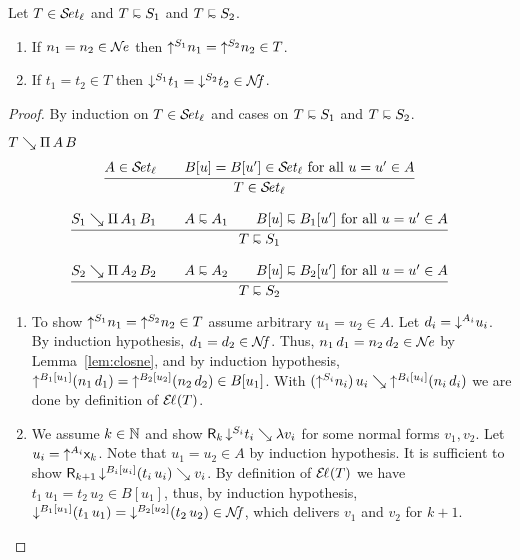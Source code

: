 \documentclass[acmlarge,review,anonymous]{acmart}\settopmatter{printfolios=true}
\begin{document}
\begin{theorem}
\label{thm:rere}
Let $T \in \SET[\ell]$ and $T \shape S_1$ and $T \shape S_2$.
\begin{enumerate}
\item If $n_1 = n_2 \in \NE$ then $\up{S_1}{n_1} = \up{S_2}{n_2} \in T$.
\item If $t_1 = t_2 \in T$ then $\down{S_1}{t_1} = \down{S_2}{t_2} \in \NF$.
\end{enumerate}
\end{theorem}
\begin{proof}
By induction on $T \in \SET[\ell]$ and cases on $T \shape S_1$ and $T \shape S_2$.
\begin{caselist}

\nextcase $T \evalsto \piT A B$
\begin{gather*}
  \ru{A \in \SET[\ell] \qquad
      B[u] = B[u'] \in \SET[\ell] \mforall u = u' \in A
    }{T \in \SET[\ell]}
\\[2ex]
  \ru{S_1 \evalsto \piT{A_1}{B_1} \qquad
      A \shape A_1 \qquad
      B[u] \shape B_1[u'] \mforall u = u' \in A
    }{T \shape S_1}
\\[2ex]
  \ru{S_2 \evalsto \piT{A_2}{B_2} \qquad
      A \shape A_2 \qquad
      B[u] \shape B_2[u'] \mforall u = u' \in A
    }{T \shape S_2}
\end{gather*}
\begin{enumerate}
\item To show $\up{S_1}{n_1} = \up{S_2}{n_2} \in T$ assume arbitrary $u_1 = u_2 \in A$.
  Let $d_i = \down{A_i}{u_i}$.
  By induction hypothesis, $d_1 = d_2 \in \NF$.
  Thus, $n_1\,d_1 = n_2\,d_2 \in \NE$ by Lemma~\ref{lem:closne}, and
  by induction hypothesis,  $\up{B_1[u_1]}(n_1\,d_1) = \up{B_2[u_2]}(n_2\,d_2) \in B[u_1]$.
  With $(\up{S_i}{n_i})\,u_i \evalsto \up{B_i[u_i]}(n_i\,d_i)$ we are done by definition of $\EL(T)$.

\item We assume $k \in \NN$ and show $\R k {\down{S_i}{t_i}} \lambda v_i$ for some normal forms
$v_1,v_2$.  Let $u_i = \up{A_i} \lev k$.  Note that $u_1 = u_2 \in A$ by induction hypothesis.
It is sufficient to show
$\R{k+1}{\down{B_i[u_i]}{(t_i\,u_i)}} {v_i}$.
By definition of $\EL(T)$ we have $t_1\,u_1 = t_2\,u_2 \in B[u_1]$, thus, by induction hypothesis,
$\down{B_1[u_1]}(t_1\,u_1) = \down{B_2[u_2]}(t_2\,u_2) \in \NF$, which delivers $v_1$ and $v_2$ for $k+1$.
\end{enumerate}


\end{caselist}
\end{proof}
\end{document}
